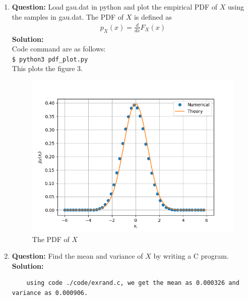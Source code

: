 \documentclass[journal,12pt,twocolumn]{IEEEtran}
\begin{document}
\begin{enumerate}[label=\thesection.\arabic*
,ref=\thesection.\theenumi]
The properties of CDF are:
    \begin{enumerate}
	\item The CDF never decreases (cumulative)
	\item $\lim_{x \to -\infty}F_X(x) = 0$
	\item $\lim_{x \to \infty}F_X(x) = 1$
    \end{enumerate}

\item\textbf{Question:}
Load gau.dat in python and plot the empirical PDF of $X$ using the samples in gau.dat. The PDF of $X$ is defined as
\begin{align}
p_{X}(x) = \frac{d}{dx}F_{X}(x)
\end{align}
\noindent \textbf{Solution:}\\

\noindent Code command are as follows:\\
\texttt{\$ python3 pdf\_plot.py}\\
This plots the figure 3.

\begin{figure}[!ht]
\centering
\includegraphics[width=\columnwidth]{./figs/Figure_3.png}
\caption{The PDF of $X$}
\label{fig:PDF_X}
\end{figure}




\item\textbf{Question: } Find the mean and variance of $X$ by writing a C program.\\
\noindent \textbf{Solution: }\\
\begin{lstlisting}
    using code ./code/exrand.c, we get the mean as 0.000326 and variance as 0.000906.
\end{lstlisting}



\end{enumerate}
\end{document}
